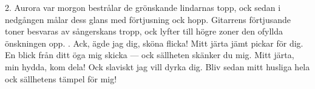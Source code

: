 \setlength{\columnsep}{0.2cm}
\begin{multicols}{2}
2.  Aurora var morgon bestrålar
    de grönskande lindarnas topp,
    ock sedan i nedgången målar
    dess glans med förtjusning ock hopp.
    Gitarrens förtjusande toner
    besvaras av sångerskans tropp,
    ock lyfter till högre zoner
    den ofyllda önskningen opp.
\vfill{}.  Ack, ägde jag dig, sköna flicka!
    Mitt järta jämt pickar för dig.
    En blick från ditt öga mig skicka —
    ock sällheten skänker du mig.
    Mitt järta, min hydda, kom dela!
    Ock slaviskt jag vill dyrka dig.
    Bliv sedan mitt husliga hela
    ock sällhetens tämpel för mig!
\end{multicols}
